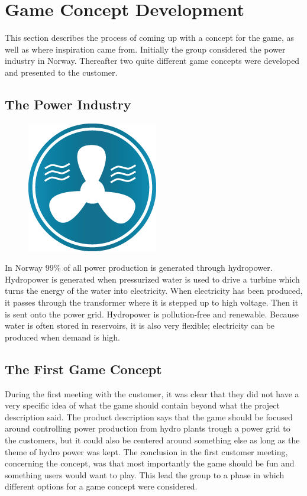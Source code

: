 \section{Game Concept Development}

This section describes the process of coming up with a concept for the game, as well as where inspiration came from. Initially the group considered the power industry in Norway. Thereafter two quite different game concepts were developed and presented to the customer.

\subsection{The Power Industry}

\begin{figure}
  \begin{center}
  \includegraphics[scale=0.5]{pictures/water_generator.png}
  \end{center}
\end{figure}

In Norway 99\% of all power production is generated through hydropower. Hydropower is generated when pressurized water is used to drive a turbine which turns the energy of the water into electricity. When electricity has been produced, it passes through the transformer where it is stepped up to high voltage. Then it is sent onto the power grid. Hydropower is pollution-free and renewable. Because water is often stored in reservoirs, it is also very flexible; electricity can be produced when demand is high. \cite{statkraftVannkraft}

\subsection{The First Game Concept}

During the first meeting with the customer, it was clear that they did not have a very specific idea of what the game should contain beyond what the project description said. The product description says that the game should be focused around controlling power production from hydro plants trough a power grid to the customers, but it could also be centered around something else as long as the theme of hydro power was kept. The conclusion in the first customer meeting, concerning the concept, was that most importantly the game should be fun and something users would want to play. This
lead the group to a phase in which different options for a game concept were considered.

